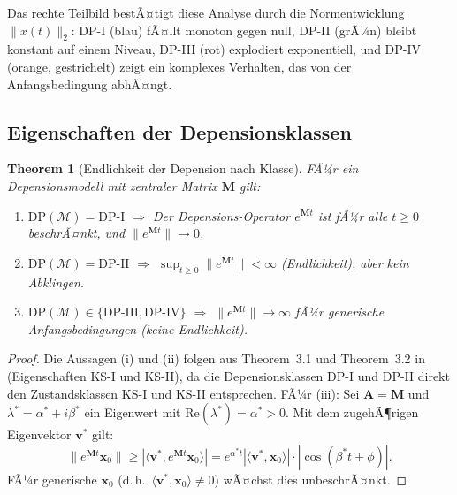﻿\documentclass[12pt, a4paper]{article}
\newtheorem{theorem}{Theorem}[section]
\theoremstyle{definition}
\theoremstyle{remark}
\newcommand{\vx}{\bm{x}}
\newcommand{\vA}{\bm{A}}
\newcommand{\re}{\mathrm{Re}}
\newcommand{\DP}{\mathrm{DP}}
\begin{document}
Das rechte Teilbild bestÃ¤tigt diese Analyse durch die Normentwicklung
$\|x(t)\|_2$: DP-I (blau) fÃ¤llt monoton gegen null, DP-II (grÃ¼n) bleibt konstant
auf einem Niveau, DP-III (rot) explodiert exponentiell, und DP-IV (orange, gestrichelt)
zeigt ein komplexes Verhalten, das von der Anfangsbedingung abhÃ¤ngt.

\subsection{Eigenschaften der Depensionsklassen}

\begin{theorem}[Endlichkeit der Depension nach Klasse]
\label{thm:endlichkeit_dp}
FÃ¼r ein Depensionsmodell mit zentraler Matrix $\mathbf{M}$ gilt:
\begin{enumerate}[label=(\roman*)]
  \item $\DP(\mathcal{M}) = \DP\text{-I}$ $\Rightarrow$ Der Depensions-Operator
    $e^{\mathbf{M}t}$ ist fÃ¼r alle $t \geq 0$ beschrÃ¤nkt, und
    $\|e^{\mathbf{M}t}\| \to 0$.
  \item $\DP(\mathcal{M}) = \DP\text{-II}$ $\Rightarrow$
    $\sup_{t \geq 0}\|e^{\mathbf{M}t}\| < \infty$ (Endlichkeit), aber
    kein Abklingen.
  \item $\DP(\mathcal{M}) \in \{\DP\text{-III}, \DP\text{-IV}\}$ $\Rightarrow$
    $\|e^{\mathbf{M}t}\| \to \infty$ fÃ¼r generische Anfangsbedingungen
    (keine Endlichkeit).
\end{enumerate}
\end{theorem}

\begin{proof}
Die Aussagen (i) und (ii) folgen aus Theorem~3.1 und Theorem~3.2 in
\citet{epp2026sysstate} (Eigenschaften KS-I und KS-II), da die Depensionsklassen
DP-I und DP-II direkt den Zustandsklassen KS-I und KS-II entsprechen. FÃ¼r (iii):
Sei $\vA = \mathbf{M}$ und $\lambda^* = \alpha^* + i\beta^*$ ein Eigenwert mit
$\re(\lambda^*) = \alpha^* > 0$. Mit dem zugehÃ¶rigen Eigenvektor $\bm{v}^*$ gilt:
\[
  \|e^{\mathbf{M}t}\vx_0\| \geq |\langle\bm{v}^*, e^{\mathbf{M}t}\vx_0\rangle|
  = e^{\alpha^* t} |\langle\bm{v}^*, \vx_0\rangle| \cdot |\cos(\beta^* t + \phi)|.
\]
FÃ¼r generische $\vx_0$ (d.\,h.\ $\langle\bm{v}^*, \vx_0\rangle \neq 0$) wÃ¤chst
dies unbeschrÃ¤nkt. \qedhere
\end{proof}
\end{document}
